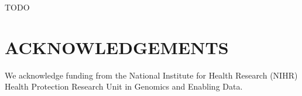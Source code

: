 \documentclass{article}
\begin{document}
TODO

\section*{ACKNOWLEDGEMENTS}

We acknowledge funding from the National Institute for Health Research (NIHR) Health Protection Research Unit in Genomics and Enabling Data.

\newpage


%

\newpage
\setcounter{figure}{0}
\setcounter{table}{0}
\makeatletter 
\renewcommand{\thefigure}{S\@arabic\c@figure} 
\renewcommand{\thetable}{S\@arabic\c@table} 
\makeatother
\end{document}

